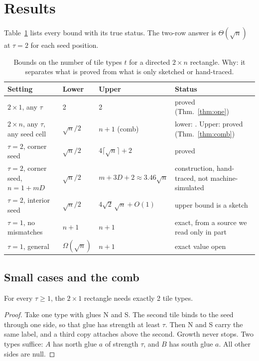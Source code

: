 \documentclass[10pt]{hackr26}
\begin{document}
\section{Results} \label{sec:res}

Table~\ref{tab:results} lists every bound with its true status.
The two-row answer is $\Theta(\sqrt n)$ at $\tau=2$ for each seed position.

\begin{table}[H]
\centering
\small
\setlength{\tabcolsep}{3pt}
\begin{tabular}{@{}p{3.6cm}p{1.9cm}p{3.5cm}p{6.2cm}@{}}
\toprule
Setting & Lower & Upper & Status \\
\midrule
$2\times1$, any $\tau$ & 2 & 2 & proved (Thm.~\ref{thm:one}) \\
\midrule
$2\times n$, any $\tau$, any seed cell & $\sqrt n/2$ & $n+1$ (comb) & lower: \cite{ACG05}. Upper: proved (Thm.~\ref{thm:comb}) \\
\midrule
$\tau=2$, corner seed & $\sqrt n/2$ & $4\lceil\sqrt n\rceil+2$ & proved \cite{ACG05} \\
\midrule
$\tau=2$, corner seed, $n=1+mD$ & $\sqrt n/2$ & $m+3D+2\approx3.46\sqrt n$ & construction, hand-traced, not machine-simulated \\
\midrule
$\tau=2$, interior seed & $\sqrt n/2$ & $4\sqrt2\,\sqrt n+O(1)$ & upper bound is a sketch \\
\midrule
$\tau=1$, no mismatches & $n+1$ & $n+1$ & exact, from a source we read only in part \\
\midrule
$\tau=1$, general & $\Omega(\sqrt n)$ & $n+1$ & exact value open \\
\bottomrule
\end{tabular}
\caption{Bounds on the number of tile types $t$ for a directed $2\times n$ rectangle. Why: it separates what is proved from what is only sketched or hand-traced.}
\label{tab:results}
\end{table}

\subsection{Small cases and the comb}

\begin{theorem}\label{thm:one}
For every $\tau\ge1$, the $2\times1$ rectangle needs exactly 2 tile types.
\end{theorem}
\begin{proof}
Take one type with glues N and S.
The second tile binds to the seed through one side, so that glue has strength at least $\tau$.
Then N and S carry the same label, and a third copy attaches above the second.
Growth never stops.
Two types suffice: $A$ has north glue $a$ of strength $\tau$, and $B$ has south glue $a$.
All other sides are null.
\end{proof}
\end{document}
